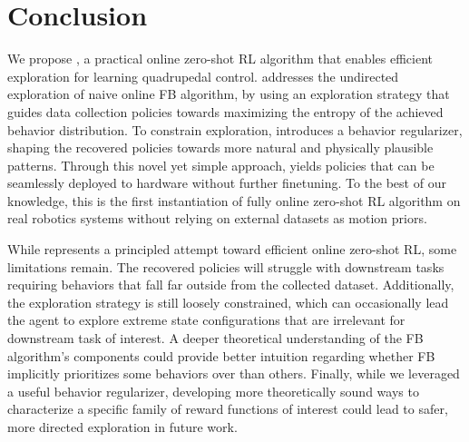\section{Conclusion}
We propose \method, a practical online zero-shot RL algorithm that enables efficient exploration for learning quadrupedal control. \method addresses the undirected exploration of naive online FB algorithm, by using an exploration strategy that guides data collection policies towards maximizing the entropy of the achieved behavior distribution. To constrain exploration, \method introduces a behavior regularizer, shaping the recovered policies towards more natural and physically plausible patterns. Through this novel yet simple approach, \method yields policies that can be seamlessly deployed to hardware without further finetuning. To the best of our knowledge, this is the first instantiation of  fully online zero-shot RL algorithm on real robotics systems without relying on external datasets as motion priors.

While \method represents a principled attempt toward efficient online zero-shot RL, some limitations remain. The recovered policies will struggle with downstream tasks requiring behaviors that fall far outside from the collected dataset. Additionally, the exploration strategy is still loosely constrained, which can occasionally lead the agent to explore extreme state configurations that are irrelevant for downstream task of interest. A deeper theoretical understanding of the FB algorithm's components could provide better intuition regarding whether FB implicitly prioritizes some behaviors over than others. Finally, while we leveraged a useful behavior regularizer, developing more theoretically sound ways to characterize a specific family of reward functions of interest could lead to safer, more directed exploration in future work.
